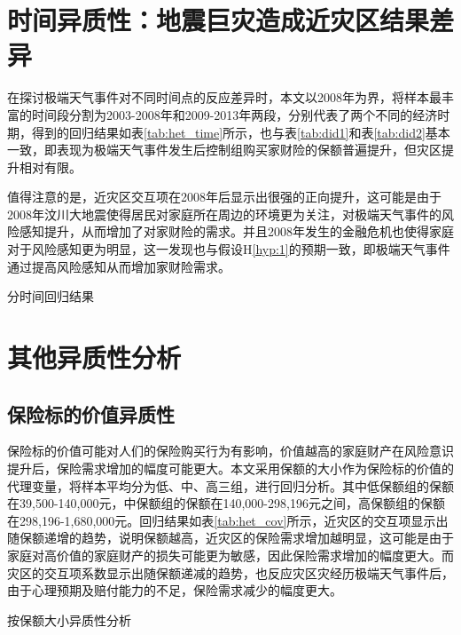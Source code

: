 \section{时间异质性：地震巨灾造成近灾区结果差异}

在探讨极端天气事件对不同时间点的反应差异时，本文以2008年为界，将样本最丰富的时间段分割为2003-2008年和2009-2013年两段，分别代表了两个不同的经济时期，得到的回归结果如表\ref{tab:het_time}所示，也与表\ref{tab:did1}和表\ref{tab:did2}基本一致，即表现为极端天气事件发生后控制组购买家财险的保额普遍提升，但灾区提升相对有限。

值得注意的是，近灾区交互项在2008年后显示出很强的正向提升，这可能是由于2008年汶川大地震使得居民对家庭所在周边的环境更为关注，对极端天气事件的风险感知提升，从而增加了对家财险的需求。并且2008年发生的金融危机也使得家庭对于风险感知更为明显，这一发现也与假设H\ref{hyp:1}的预期一致，即极端天气事件通过提高风险感知从而增加家财险需求。
\begin{table}[H]
    \centering
    \caption{分时间回归结果}\label{tab:het_time}
    
\end{table}

\section{其他异质性分析}
\subsection{保险标的价值异质性}
保险标的价值可能对人们的保险购买行为有影响，价值越高的家庭财产在风险意识提升后，保险需求增加的幅度可能更大。本文采用保额的大小作为保险标的价值的代理变量，将样本平均分为低、中、高三组，进行回归分析。其中低保额组的保额在39,500-140,000元，中保额组的保额在140,000-298,196元之间，高保额组的保额在298,196-1,680,000元。回归结果如表\ref{tab:het_cov}所示，近灾区的交互项显示出随保额递增的趋势，说明保额越高，近灾区的保险需求增加越明显，这可能是由于家庭对高价值的家庭财产的损失可能更为敏感，因此保险需求增加的幅度更大。而灾区的交互项系数显示出随保额递减的趋势，也反应灾区灾经历极端天气事件后，由于心理预期及赔付能力的不足，保险需求减少的幅度更大。
\begin{table}
    \centering
    \caption{按保额大小异质性分析}\label{tab:het_cov}
    
\end{table}

